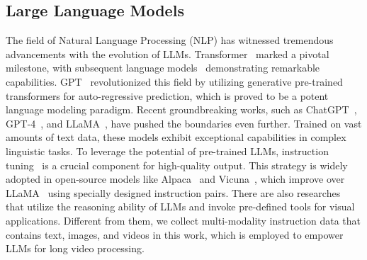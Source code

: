 \subsection{Large Language Models}
The field of Natural Language Processing (NLP) has witnessed tremendous advancements with the evolution of LLMs.
Transformer~\cite{vaswani2017attention} marked a pivotal milestone, with subsequent language models~\cite{devlin2018bert,liu2019roberta,zhang2022opt} demonstrating remarkable capabilities.
GPT~\cite{brown2020language} revolutionized this field by utilizing generative pre-trained transformers for auto-regressive prediction, which is proved to be a potent language modeling paradigm. 
Recent groundbreaking works, such as ChatGPT~\cite{ChatGPT}, GPT-4~\cite{GPT4}, and LLaMA~\cite{llama}, have pushed the boundaries even further. 
Trained on vast amounts of text data, these models exhibit exceptional capabilities in complex linguistic tasks.
To leverage the potential of pre-trained LLMs, instruction tuning~\cite{wei2021finetuned,ouyang2022training} is a crucial component for high-quality output.
This strategy is widely adopted in open-source models like Alpaca~\cite{alpaca} and Vicuna~\cite{vicuna}, which improve over LLaMA~\cite{llama} using specially designed instruction pairs. 
There are also researches~\cite{visualchatgpt,gpt4tools} that utilize the reasoning ability of LLMs and invoke pre-defined tools for visual applications.
Different from them, we collect multi-modality instruction data that contains text, images, and videos in this work, which is employed to empower LLMs for long video processing.

